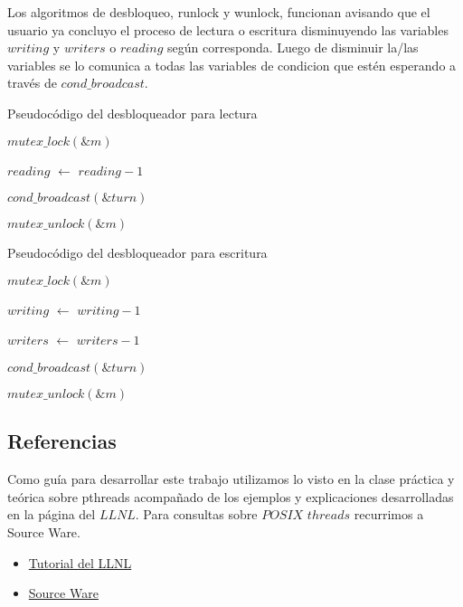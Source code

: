 Los algoritmos de desbloqueo, runlock y wunlock, funcionan avisando que el usuario ya concluyo el proceso de lectura o escritura disminuyendo las variables $writing$ y $writers$ o $reading$ según corresponda. Luego de disminuir la/las variables se lo comunica a todas las variables de condicion que estén esperando a través de $cond\_broadcast$.

\begin{algorithm}[H]
  \begin{algorithmic}[1]
  \caption{Pseudocódigo del desbloqueador para lectura}
  \label{algo:3-1}
	\State $mutex\_lock(\&m)$

	\State $reading$ $\leftarrow$ $reading - 1$
	
	\State $cond\_broadcast(\&turn)$

	\State $mutex\_unlock(\&m)$

	\EndProcedure
	\end{algorithmic}
\end{algorithm}

\begin{algorithm}[H]
  \begin{algorithmic}[1]
  \caption{Pseudocódigo del desbloqueador para escritura}
  \label{algo:3-1}
	\State $mutex\_lock(\&m)$

	\State $writing$ $\leftarrow$ $writing - 1$
	
	\State $writers$ $\leftarrow$ $writers - 1$
	
	\State $cond\_broadcast(\&turn)$

	\State $mutex\_unlock(\&m)$

	\EndProcedure
	\end{algorithmic}
\end{algorithm}


\subsection{Referencias}

Como guía para desarrollar este trabajo utilizamos lo visto en la clase práctica y teórica sobre pthreads acompañado de los ejemplos y explicaciones desarrolladas en la página  del $LLNL$. Para consultas sobre $POSIX$ $threads$ recurrimos a Source Ware.

\begin{itemize}

\item \href{https://computing.llnl.gov/tutorials/pthreads/}{Tutorial del LLNL}

\item \href{https://www.sourceware.org/pthreads-win32/manual/}{Source Ware}

\end{itemize}


%
%
%
